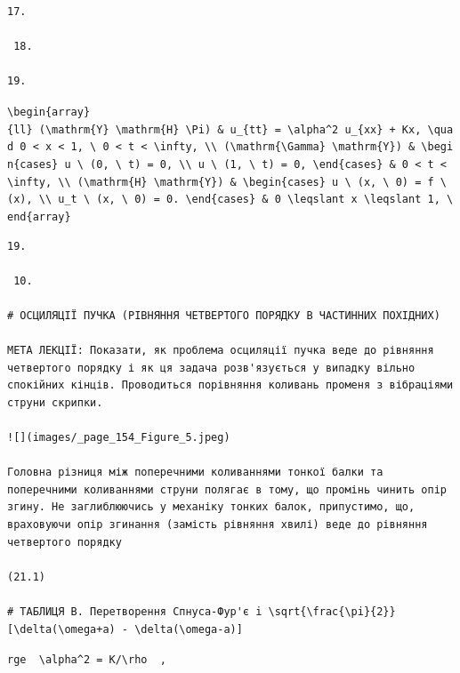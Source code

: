 \documentclass[
  ukrainian,
]{article}
\begin{document}
\begin{verbatim}
17.

 18.

19.
\end{verbatim}

\texttt{\textbackslash{}begin\{array\}\{ll\}\ (\textbackslash{}mathrm\{Y\}\ \textbackslash{}mathrm\{H\}\ \textbackslash{}Pi)\ \&\ u\_\{tt\}\ =\ \textbackslash{}alpha\^{}2\ u\_\{xx\}\ +\ Kx,\ \textbackslash{}quad\ 0\ \textless{}\ x\ \textless{}\ 1,\ \textbackslash{}\ 0\ \textless{}\ t\ \textless{}\ \textbackslash{}infty,\ \textbackslash{}\textbackslash{}\ (\textbackslash{}mathrm\{\textbackslash{}Gamma\}\ \textbackslash{}mathrm\{Y\})\ \&\ \textbackslash{}begin\{cases\}\ u\ \textbackslash{}\ (0,\ \textbackslash{}\ t)\ =\ 0,\ \textbackslash{}\textbackslash{}\ u\ \textbackslash{}\ (1,\ \textbackslash{}\ t)\ =\ 0,\ \textbackslash{}end\{cases\}\ \&\ 0\ \textless{}\ t\ \textless{}\ \textbackslash{}infty,\ \textbackslash{}\textbackslash{}\ (\textbackslash{}mathrm\{H\}\ \textbackslash{}mathrm\{Y\})\ \&\ \textbackslash{}begin\{cases\}\ u\ \textbackslash{}\ (x,\ \textbackslash{}\ 0)\ =\ f\ \textbackslash{}\ (x),\ \textbackslash{}\textbackslash{}\ u\_t\ \textbackslash{}\ (x,\ \textbackslash{}\ 0)\ =\ 0.\ \textbackslash{}end\{cases\}\ \&\ 0\ \textbackslash{}leqslant\ x\ \textbackslash{}leqslant\ 1,\ \textbackslash{}end\{array\}}

\begin{verbatim}
19.

 10.

# ОСЦИЛЯЦІЇ ПУЧКА (РІВНЯННЯ ЧЕТВЕРТОГО ПОРЯДКУ В ЧАСТИННИХ ПОХІДНИХ)

МЕТА ЛЕКЦІЇ: Показати, як проблема осциляції пучка веде до рівняння четвертого порядку і як ця задача розв'язується у випадку вільно спокійних кінців. Проводиться порівняння коливань променя з вібраціями струни скрипки.

![](images/_page_154_Figure_5.jpeg)

Головна різниця між поперечними коливаннями тонкої балки та поперечними коливаннями струни полягає в тому, що промінь чинить опір згину. Не заглиблюючись у механіку тонких балок, припустимо, що, враховуючи опір згинання (замість рівняння хвилі) веде до рівняння четвертого порядку

(21.1)

# ТАБЛИЦЯ B. Перетворення Спнуса-Фур'є i \sqrt{\frac{\pi}{2}} [\delta(\omega+a) - \delta(\omega-a)]
\end{verbatim}

\texttt{rge\ \ \textbackslash{}alpha\^{}2\ =\ K/\textbackslash{}rho\ \ ,}
\end{document}
